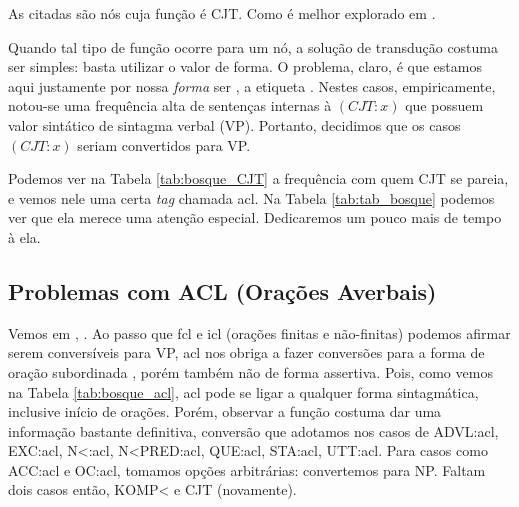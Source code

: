 As  citadas são nós cuja função é CJT. Como é melhor explorado em \cite[p~96]{afonso2006arvores} .

Quando tal tipo de função ocorre para um nó, a solução de transdução costuma ser simples: basta utilizar o valor de forma. O problema, claro, é que estamos aqui justamente por nossa \textit{forma} ser , a etiqueta . Nestes casos, empiricamente, notou-se uma frequência alta de sentenças internas à $(CJT:x)$ que possuem valor sintático de sintagma verbal (VP). Portanto, decidimos que os casos $(CJT:x)$ seriam convertidos para VP.
\begin{center}
    
\end{center}

Podemos ver na Tabela \ref{tab:bosque_CJT} a frequência com quem CJT se pareia, e vemos nele uma certa \textit{tag} chamada acl. Na Tabela \ref{tab:tab_bosque} podemos ver que ela merece uma atenção especial. Dedicaremos um pouco mais de tempo à ela.
\subsection{Problemas com ACL (Orações Averbais)}
\label{subsec:tag_acl}
Vemos em \cite{freitas2007biblia}, . Ao passo que fcl e icl (orações finitas e não-finitas) podemos afirmar serem conversíveis para VP, acl nos obriga a fazer conversões para a forma de oração subordinada \cite[p~172]{bracketing_ptb}, porém também não de forma assertiva. Pois, como vemos na Tabela \ref{tab:bosque_acl}, acl pode se ligar a qualquer forma sintagmática, inclusive início de orações. Porém, observar a função costuma dar uma informação bastante definitiva, conversão que adotamos nos casos de ADVL:acl, EXC:acl, N<:acl, N<PRED:acl, QUE:acl, STA:acl, UTT:acl. Para casos como ACC:acl e OC:acl, tomamos opções arbitrárias: convertemos para NP. Faltam dois casos então, KOMP< e CJT (novamente).
\begin{center}
    
\end{center}
